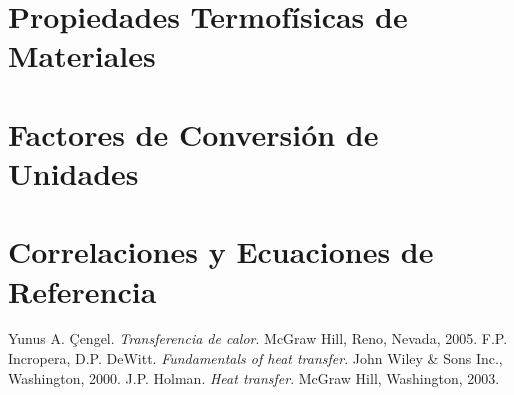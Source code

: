 \documentclass[12pt,a4paper,twoside]{book}
\begin{document}
	\appendix
	\chapter{Propiedades Termofísicas de Materiales}
	\chapter{Factores de Conversión de Unidades}
	\chapter{Correlaciones y Ecuaciones de Referencia}
	
	\backmatter
	\begin{thebibliography}{99}
		 Yunus A. Çengel. \textit{Transferencia de calor}. McGraw Hill, Reno, Nevada, 2005.
		 F.P. Incropera, D.P. DeWitt. \textit{Fundamentals of heat transfer}. John Wiley \& Sons Inc., Washington, 2000.
		 J.P. Holman. \textit{Heat transfer}. McGraw Hill, Washington, 2003.
	\end{thebibliography}
	
\end{document}
